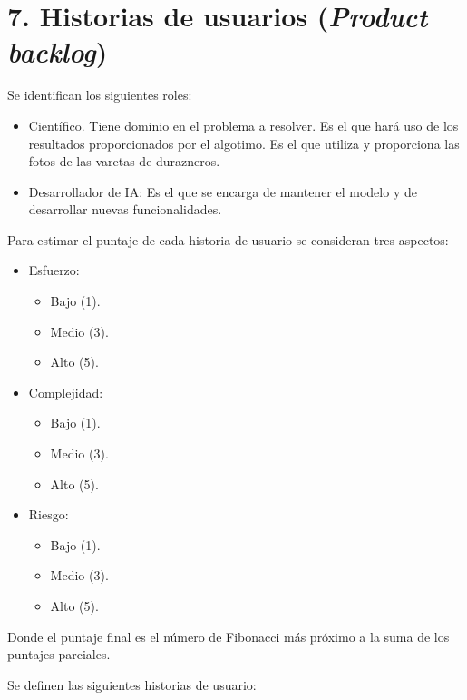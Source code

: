\documentclass[
11pt, %
codirector, %
]{charter}
\begin{document}
\section{7. Historias de usuarios (\textit{Product backlog})}
\label{sec:backlog}

Se identifican los siguientes roles:

\begin{itemize}
	\item Científico. Tiene dominio en el problema a resolver. Es el que hará uso de los resultados proporcionados por el algotimo. Es el que utiliza y proporciona las fotos de las varetas de durazneros. 
	\item Desarrollador de IA: Es el que se encarga de mantener el modelo y de desarrollar nuevas funcionalidades.
\end{itemize}

Para estimar el puntaje de cada historia de usuario se consideran tres aspectos:

\begin{itemize}
	\item Esfuerzo:
	\begin{itemize}
	\item Bajo (1). 
	\item Medio (3). 
	\item Alto (5).
\end{itemize}
	\item Complejidad: 
	\begin{itemize}
	\item Bajo (1).
	\item Medio (3). 
	\item Alto (5).
\end{itemize}
	\item Riesgo:
	\begin{itemize}
	\item Bajo (1). 
	\item Medio (3). 
	\item Alto (5).
\end{itemize}
\end{itemize}

Donde el puntaje final es el número de Fibonacci más próximo a la suma de los puntajes parciales.

Se definen las siguientes historias de usuario:
\end{document}
